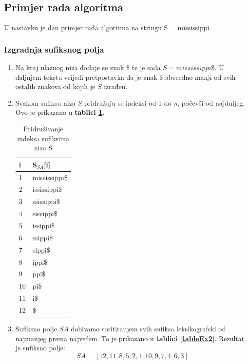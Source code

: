 \documentclass[a4paper,12pt]{article}
\begin{document}
\subsection{Primjer rada algoritma}
U nastavku je dan primjer rada algoritma na stringu S = mississippi.

\subsubsection{Izgradnja sufiksnog polja}

\begin{enumerate}
	\item Na kraj ulaznog niza dodaje se znak \$ te je sada $S =  mississippi\$$. U daljnjem tekstu vrijedi pretpostavka da je znak \$ abecedno manji od svih ostalih znakova od kojih je $S$ izrađen.
	\item Svakom sufiksu niza $S$ pridružuju se indeksi od 1 do \textit{n}, počevši od najduljeg. Ovo je prikazano u \textbf{tablici \ref{tableEx1}}.

	\begin{table}[h!]
		\caption{Pridruživanje indeksa sufiksima niza S}
		\label{tableEx1}
		\begin{center}
			\begin{tabular}{ll}
				\toprule
				i & S$_{SA}$[i] \\
				\midrule
				1 & mississippi\$ \\
				2 & ississippi\$ \\
				3 & ssissippi\$ \\
				4 & sissippi\$ \\
				5 & issippi\$ \\
				6 & ssippi\$ \\
				7 & sippi\$ \\
				8 & ippi\$ \\
				9 & ppi\$ \\
				10 & pi\$ \\
				11 & i\$ \\
				12 & \$ \\
				\bottomrule
			\end{tabular}
		\end{center}
	\end{table}

	\item Sufiksno polje $SA$ dobivamo soritiranjem svih sufiksa leksikografski od najmanjeg prema najvećem. To je prikazano u \textbf{tablici \ref{tableEx2}}. Rezultat je sufiksno polje:
	$$SA = [12, 11, 8, 5, 2, 1, 10, 9, 7, 4, 6, 3]$$


\end{enumerate}
\end{document}
